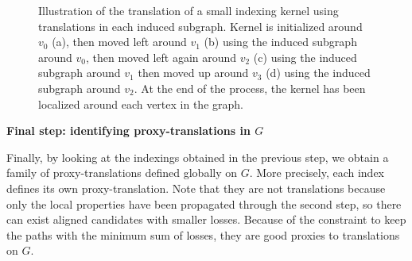 \begin{figure}[h!]
\begin{center}
  \end{center}
  \caption{Illustration of the translation of a small indexing kernel using translations in each induced subgraph. Kernel is initialized around $v_0$ (a), then moved left around $v_1$ (b) using the induced subgraph around $v_0$, then moved left again around $v_2$ (c) using the induced subgraph around $v_1$ then moved up around $v_3$ (d) using the induced subgraph around $v_2$. At the end of the process, the kernel has been localized around each vertex in the graph.}
  \label{movekernel}
\end{figure}

\noindent\textbf{Final step: identifying proxy-translations in $G$}

Finally, by looking at the indexings obtained in the previous step, we obtain a family of proxy-translations defined globally on $G$. More precisely, each index defines its own proxy-translation. Note that they are not translations because only the local properties have been propagated through the second step, so there can exist aligned candidates with smaller losses. Because of the constraint to keep the paths with the minimum sum of losses, they are good proxies to translations on $G$.

